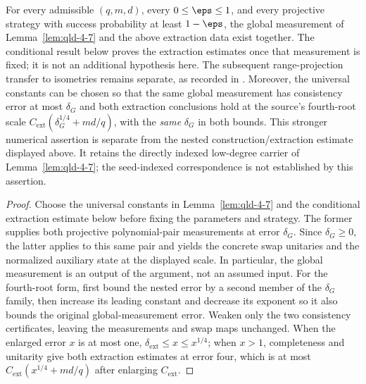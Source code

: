 \begin{lemma}
	For every admissible $(q,m,d)$, every $0\leq\eps\leq1$, and every projective
	strategy with success probability at least $1-\eps$, the global measurement
	of Lemma~\ref{lem:qld-4-7} and the above extraction data exist together.
	The conditional result below proves the extraction estimates once that
	measurement is fixed; it is not an additional hypothesis here. The subsequent
	range-projection transfer to isometries remains separate, as recorded in
	\cite{gap:qpbt_extraction-transfer}.
	Moreover, the universal constants can be chosen so that the same global
	measurement has consistency error at most $\delta_G$ and both extraction
	conclusions hold at the source's fourth-root scale
	$C_{\mathrm{ext}}(\delta_G^{1/4}+md/q)$, with the \emph{same} $\delta_G$
	in both bounds. This stronger numerical assertion is separate from the
	nested construction/extraction estimate displayed above. It retains the
	directly indexed low-degree carrier of Lemma~\ref{lem:qld-4-7}; the
	seed-indexed correspondence is not established by this assertion.
\end{lemma}
\begin{proof}
	\leanok
	Choose the universal constants in Lemma~\ref{lem:qld-4-7} and the
	conditional extraction estimate below before fixing the parameters and
	strategy. The former supplies both projective polynomial-pair measurements
	at error $\delta_G$. Since $\delta_G\geq0$, the latter applies to this same
	pair and yields the concrete swap unitaries and the normalized auxiliary state
	at the displayed scale. In particular, the global measurement is an output
	of the argument, not an assumed input.
	For the fourth-root form, first bound the nested error by a second member
	of the $\delta_G$ family, then increase its leading constant and decrease
	its exponent so it also bounds the original global-measurement error.
	Weaken only the two consistency certificates, leaving the measurements
	and swap maps unchanged. When the enlarged error $x$ is at most one,
	$\delta_{\mathrm{ext}}\leq x\leq x^{1/4}$; when $x>1$, completeness and
	unitarity give both extraction estimates at error four, which is at most
	$C_{\mathrm{ext}}(x^{1/4}+md/q)$ after enlarging $C_{\mathrm{ext}}$.
\end{proof}

